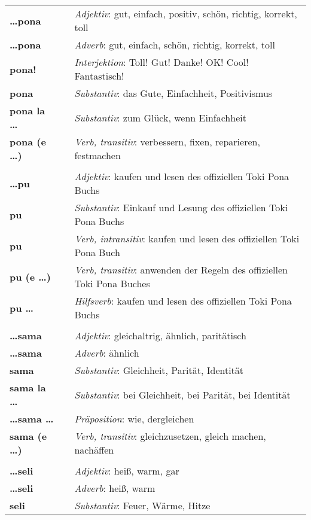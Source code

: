 \begin{supertabular}{p{2,5cm}|ll}
\textbf{\dots pona} && \textit{Adjektiv}: gut, einfach, positiv, schön, richtig, korrekt, toll \\ 
\textbf{\dots pona} && \textit{Adverb}: gut, einfach, schön, richtig, korrekt, toll \\ 
\textbf{pona!} && \textit{Interjektion}: Toll! Gut! Danke! OK! Cool! Fantastisch! \\ 
\textbf{pona} && \textit{Substantiv}: das Gute, Einfachheit, Positivismus \\ 
\textbf{pona la \dots} && \textit{Substantiv}: zum Glück, wenn Einfachheit \\ 
\textbf{pona (e \dots)} && \textit{Verb, transitiv}: verbessern, fixen, reparieren, festmachen \\ 
 && \\ %
\textbf{\dots pu} && \textit{Adjektiv}: kaufen und lesen des offiziellen Toki Pona Buchs \\ 
\textbf{pu} && \textit{Substantiv}: Einkauf und Lesung des offiziellen Toki Pona Buchs \\ 
\textbf{pu} && \textit{Verb, intransitiv}: kaufen und lesen des offiziellen Toki Pona Buch \\ 
\textbf{pu (e \dots)} && \textit{Verb, transitiv}: anwenden der Regeln des offiziellen Toki Pona Buches \\ 
\textbf{pu \dots} && \textit{Hilfsverb}: kaufen und lesen des offiziellen Toki Pona Buchs \\ 
 && \\ %
\textbf{\dots sama} && \textit{Adjektiv}: gleichaltrig, ähnlich, paritätisch \\ 
\textbf{\dots sama} && \textit{Adverb}: ähnlich \\ 
\textbf{sama} && \textit{Substantiv}: Gleichheit, Parität, Identität \\ 
\textbf{sama la \dots} && \textit{Substantiv}: bei Gleichheit, bei Parität, bei Identität  \\ 
\textbf{\dots sama \dots} && \textit{Präposition}: wie, dergleichen \\ 
\textbf{sama (e \dots)} && \textit{Verb, transitiv}: gleichzusetzen, gleich machen, nachäffen \\ 
 && \\ %
\textbf{\dots seli} && \textit{Adjektiv}: heiß, warm, gar \\ 
\textbf{\dots seli} && \textit{Adverb}: heiß, warm \\ 
\textbf{seli} && \textit{Substantiv}: Feuer, Wärme, Hitze \\ 

\end{supertabular}
